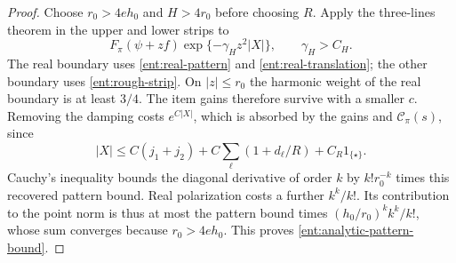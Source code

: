 \begin{proof}
Choose \(r_0>4e h_0\) and \(H>4r_0\) before choosing
\(R\).  Apply the three-lines theorem in the upper and
lower strips to
\[
           F_\pi(\psi+zf)\exp\{-\gamma_Hz^2|X|\},
                         \qquad \gamma_H>C_H.
\]
The real boundary uses \eqref{ent:real-pattern} and
\eqref{ent:real-translation}; the other boundary uses
\eqref{ent:rough-strip}.  On \(|z|\le r_0\) the harmonic
weight of the real boundary is at least \(3/4\).
The item gains therefore survive with a smaller \(c\).
Removing the damping costs \(e^{C|X|}\), which is
absorbed by the gains and \(\mathcal C_\pi(s)\), since
\[
 |X|\le C(j_1+j_2)+C\sum_\ell(1+d_\ell/R)
                         +C_R1_{\{\star\}}.
\]
Cauchy's inequality bounds the diagonal derivative of
order \(k\) by \(k!r_0^{-k}\) times this recovered
pattern bound.  Real polarization costs a further
\(k^k/k!\).  Its contribution to the point norm is thus
at most the pattern bound times
\((h_0/r_0)^k k^k/k!\), whose sum converges because
\(r_0>4e h_0\).  This proves
\eqref{ent:analytic-pattern-bound}.
\end{proof}

